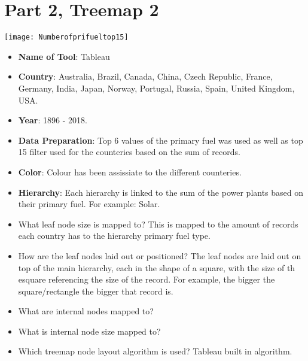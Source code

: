 \hypertarget{part-2-treemap-2}{%
\section{Part 2, Treemap 2}\label{part-2-treemap-2}}

\centering
\texttt{[image: Numberofprifueltop15]}

\begin{itemize}
\tightlist
\item
  \textbf{Name of Tool}: Tableau
\item
  \textbf{Country}: Australia, Brazil, Canada, China, Czech Republic, France, Germany, India, Japan, Norway, Portugal, Russia, Spain, United Kingdom, USA.
\item
  \textbf{Year}: 1896 - 2018.
\item
  \textbf{Data Preparation}: Top 6 values of the primary fuel was used as well as top 15 filter used for the counteries based on the sum of records.
\item
  \textbf{Color}: Colour has been assissiate to the different counteries.
\item
  \textbf{Hierarchy}: Each hierarchy is linked to the sum of the power plants based on their primary fuel. For example: Solar. 
\item
  What leaf node size is mapped to? This is mapped to the amount of records each country has to the hierarchy primary fuel type.
\item
  How are the leaf nodes laid out or positioned? The leaf nodes are laid out on top of the main hierarchy, each in the shape of a square, with the size of th esquare referencing the size of the record. For example, the bigger the square/rectangle the bigger that record is.
\item
  What are internal nodes mapped to?
\item
  What is internal node size mapped to?
\item
  Which treemap node layout algorithm is used?
  Tableau built in algorithm.
\end{itemize}
